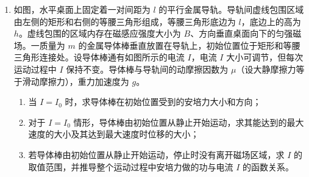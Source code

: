 \documentclass[\gkver]{gaokaozhenti}
\begin{document}
\begin{enumerate}
{所以消耗的能量为 $W = P_{\text{出}}t = 20400 \times \frac{100}{27} \times 3600\UJ = 2.72 \times 10^{8}\UJ$。

方案三中 $v = 120\Ukmh = \frac{100}{3}\Ums$，则由题可知 $\eta = 0.8$，此时有

\[ F' = F_{1} + F_{2} = k_{1}Mg + k_{2}v^{2} = 688\UN \]

电池输出功率 $P_{\text{出}}' = \frac{F'v}{\eta} = \frac{\frac{100}{3} \times 688}{0.8}\UW = \frac{344000}{12}\UW = \frac{86000}{3}\UW$，

整个过程行驶的时间 $t' = \frac{400}{120}\Uh = 12000\Us$，

所以消耗的能量为 $W' = P_{\text{出}}'t' = \frac{86000}{3} \times 12000\UJ = 3.44 \times 10^{8}\UJ$。

根据前面的计算可知电池的最大储能为 $E = 3.24 \times 10^{8}\UJ < 3.44 \times 10^{8}\UJ$，故方案三也不可行；所以应该选择方案二。
}
\item
如图，水平桌面上固定着一对间距为 $l$ 的平行金属导轨。导轨间虚线包围区域由左侧的矩形和右侧的等腰三角形组成，等腰三角形底边为 $l$，底边上的高为 $h$。虚线包围的区域内存在磁感应强度大小为 $B$、方向垂直桌面向下的匀强磁场。一质量为 $m$ 的金属导体棒垂直放置在导轨上，初始位置位于矩形和等腰三角形连接处。设导体棒通有如图所示的电流 $I$，电流 $I$ 大小可调节，但每次运动过程中 $I$ 保持不变。导体棒与导轨间的动摩擦因数为 $\mu$（设大静摩擦力等于滑动摩擦力），重力加速度为 $g$。

\begin{enumerate}
	\item
	当 $I = I_{0}$ 时，求导体棒在初始位置受到的安培力大小和方向；
	\item
	对于 $I = I_{0}$ 情形，导体棒由初始位置从静止开始运动，求其能达到的最大速度的大小及其达到最大速度时位移的大小；
	\item
	若导体棒由初始位置从静止开始运动，停止时没有离开磁场区域，求 $I$ 的取值范围，并推导整个运动过程中安培力做的功与电流 $I$ 的函数关系。
\end{enumerate}

\onepicture[align=right, w=8.49cm]{}


\end{enumerate}
\end{document}
